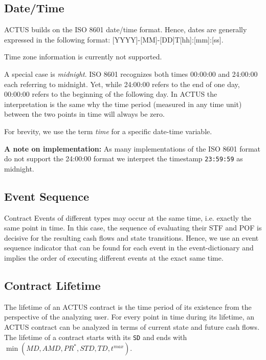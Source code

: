 \documentclass[9pt,oneside]{amsart}
\newcommand{\attr}[1]{\texttt{#1}}
\newcommand{\tmax}{t^{max}}
\begin{document}
\begin{multicols}{2}
\subsection{Date/Time}\label{sec:time}

ACTUS builds on the ISO 8601 date/time format. Hence, dates are generally expressed in the following format: [YYYY]-[MM]-[DD]T[hh]:[mm]:[ss].

Time zone information is currently not supported.

A special case is \textit{midnight}. ISO 8601 recognizes both times 00:00:00 and 24:00:00 each referring to midnight. Yet, while 24:00:00 refers to the end of one day, 00:00:00 refers to the beginning of the following day. In ACTUS the interpretation is the same why the time period (measured in any time unit) between the two points in time will always be zero.

For brevity, we use the term \textit{time} for a specific date-time variable.

\textbf{A note on implementation:} As many implementations of the ISO 8601 format do not support the 24:00:00 format we interpret the timestamp \verb'23:59:59' as midnight.


\subsection{Event Sequence}\label{sec:eventseq}

Contract Events of different types may occur at the same time, i.e. exactly the same point in time. In this case, the sequence of evaluating their STF and POF is decisive for the resulting cash flows and state transitions. Hence, we use an event sequence indicator that can be found for each event in the event-dictionary and implies the order of executing different events at the exact same time.


\subsection{Contract Lifetime}\label{sec:lifetime}

The lifetime of an ACTUS contract is the time period of its existence from the perspective of the analyzing user. For every point in time during its lifetime, an ACTUS contract can be analyzed in terms of current state and future cash flows.\\

The lifetime of a contract starts with its \attr{SD} and ends with $\min(MD, AMD, PR^*, STD, TD,\tmax)$.\\


\end{multicols}
\end{document}
